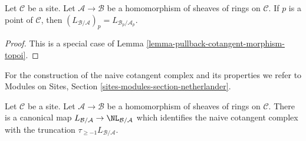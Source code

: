 \begin{lemma}
\label{lemma-stalk-cotangent-complex}
Let $\mathcal{C}$ be a site. Let $\mathcal{A} \to \mathcal{B}$ be a
homomorphism of sheaves of rings on $\mathcal{C}$. If $p$ is a point
of $\mathcal{C}$, then
$(L_{\mathcal{B}/\mathcal{A}})_p = L_{\mathcal{B}_p/\mathcal{A}_p}$.
\end{lemma}

\begin{proof}
This is a special case of Lemma \ref{lemma-pullback-cotangent-morphism-topoi}.
\end{proof}

\noindent
For the construction of the naive cotangent complex and its properties
we refer to
Modules on Sites, Section \ref{sites-modules-section-netherlander}.

\begin{lemma}
\label{lemma-compare-cotangent-complex-with-naive}
Let $\mathcal{C}$ be a site. Let $\mathcal{A} \to \mathcal{B}$ be a
homomorphism of sheaves of rings on $\mathcal{C}$.
There is a canonical map
$L_{\mathcal{B}/\mathcal{A}} \to \NL_{\mathcal{B}/\mathcal{A}}$
which identifies the naive cotangent complex with the truncation
$\tau_{\geq -1}L_{\mathcal{B}/\mathcal{A}}$.
\end{lemma}

